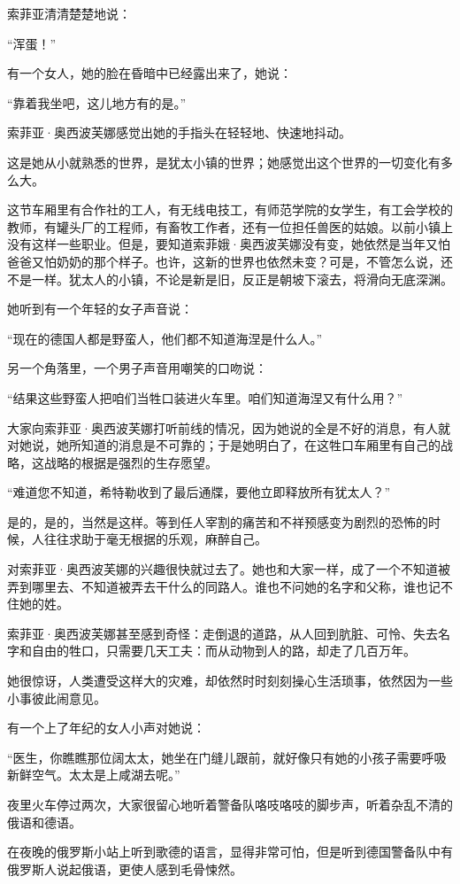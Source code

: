 索菲亚清清楚楚地说：

“浑蛋！”

有一个女人，她的脸在昏暗中已经露出来了，她说：

“靠着我坐吧，这儿地方有的是。”

索菲亚·奥西波芙娜感觉出她的手指头在轻轻地、快速地抖动。

这是她从小就熟悉的世界，是犹太小镇的世界；她感觉出这个世界的一切变化有多么大。

这节车厢里有合作社的工人，有无线电技工，有师范学院的女学生，有工会学校的教师，有罐头厂的工程师，有畜牧工作者，还有一位担任兽医的姑娘。以前小镇上没有这样一些职业。但是，要知道索菲娥·奥西波芙娜没有变，她依然是当年又怕爸爸又怕奶奶的那个样子。也许，这新的世界也依然未变？可是，不管怎么说，还不是一样。犹太人的小镇，不论是新是旧，反正是朝坡下滚去，将滑向无底深渊。

她听到有一个年轻的女子声音说：

“现在的德国人都是野蛮人，他们都不知道海涅是什么人。”

另一个角落里，一个男子声音用嘲笑的口吻说：

“结果这些野蛮人把咱们当牲口装进火车里。咱们知道海涅又有什么用？”

大家向索菲亚·奥西波芙娜打听前线的情况，因为她说的全是不好的消息，有人就对她说，她所知道的消息是不可靠的；于是她明白了，在这牲口车厢里有自己的战略，这战略的根据是强烈的生存愿望。

“难道您不知道，希特勒收到了最后通牒，要他立即释放所有犹太人？”

是的，是的，当然是这样。等到任人宰割的痛苦和不祥预感变为剧烈的恐怖的时候，人往往求助于毫无根据的乐观，麻醉自己。

对索菲亚·奥西波芙娜的兴趣很快就过去了。她也和大家一样，成了一个不知道被弄到哪里去、不知道被弄去干什么的同路人。谁也不问她的名字和父称，谁也记不住她的姓。

索菲亚·奥西波芙娜甚至感到奇怪：走倒退的道路，从人回到肮脏、可怜、失去名字和自由的牲口，只需要几天工夫：而从动物到人的路，却走了几百万年。

她很惊讶，人类遭受这样大的灾难，却依然时时刻刻操心生活琐事，依然因为一些小事彼此闹意见。

有一个上了年纪的女人小声对她说：

“医生，你瞧瞧那位阔太太，她坐在门缝儿跟前，就好像只有她的小孩子需要呼吸新鲜空气。太太是上咸湖去呢。”

夜里火车停过两次，大家很留心地听着警备队咯吱咯吱的脚步声，听着杂乱不清的俄语和德语。

在夜晚的俄罗斯小站上听到歌德的语言，显得非常可怕，但是听到德国警备队中有俄罗斯人说起俄语，更使人感到毛骨悚然。

